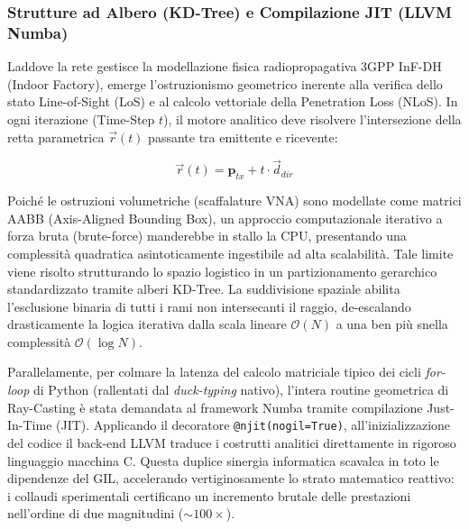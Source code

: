 \documentclass[twoside]{article}
\begin{document}
\subsubsection{Strutture ad Albero (KD-Tree) e Compilazione JIT (LLVM Numba)}

Laddove la rete gestisce la modellazione fisica radiopropagativa 3GPP InF-DH (Indoor Factory), emerge l'ostruzionismo geometrico inerente alla verifica dello stato Line-of-Sight (LoS) e al calcolo vettoriale della Penetration Loss (NLoS). In ogni iterazione (Time-Step $t$), il motore analitico deve risolvere l'intersezione della retta parametrica $\vec{r}(t)$ passante tra emittente e ricevente:

\begin{equation}
\vec{r}(t) = \mathbf{p}_{tx} + t \cdot \vec{d}_{dir}
\label{eq:ray_casting_parametric}
\end{equation}

Poiché le ostruzioni volumetriche (scaffalature VNA) sono modellate come matrici AABB (Axis-Aligned Bounding Box), un approccio computazionale iterativo a forza bruta (brute-force) manderebbe in stallo la CPU, presentando una complessità quadratica asintoticamente ingestibile ad alta scalabilità. Tale limite viene risolto strutturando lo spazio logistico in un partizionamento gerarchico standardizzato tramite alberi KD-Tree. La suddivisione spaziale abilita l'esclusione binaria di tutti i rami non intersecanti il raggio, de-escalando drasticamente la logica iterativa dalla scala lineare $\mathcal{O}(N)$ a una ben più snella complessità $\mathcal{O}(\log N)$.

Parallelamente, per colmare la latenza del calcolo matriciale tipico dei cicli \textit{for-loop} di Python (rallentati dal \textit{duck-typing} nativo), l'intera routine geometrica di Ray-Casting è stata demandata al framework Numba tramite compilazione Just-In-Time (JIT). Applicando il decoratore \texttt{@njit(nogil=True)}, all'inizializzazione del codice il back-end LLVM traduce i costrutti analitici direttamente in rigoroso linguaggio macchina C. Questa duplice sinergia informatica scavalca in toto le dipendenze del GIL, accelerando vertiginosamente lo strato matematico reattivo: i collaudi sperimentali certificano un incremento brutale delle prestazioni nell'ordine di due magnitudini ($\sim 100\times$).
\end{document}
